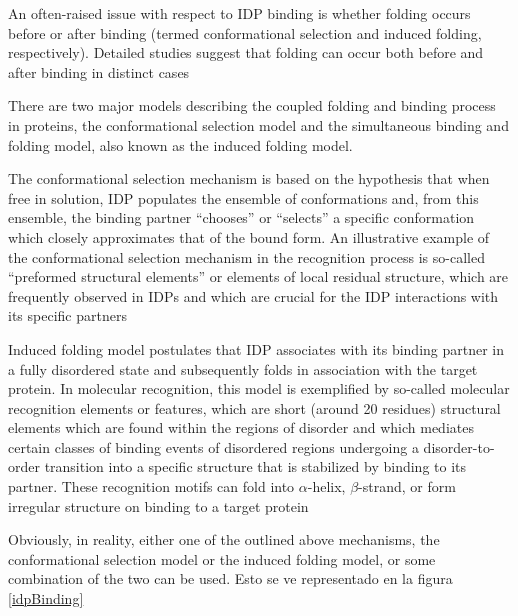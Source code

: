 An often-raised issue with respect to IDP binding is whether folding occurs before or after binding (termed conformational selection and induced folding, respectively).
Detailed studies suggest that folding can occur both before and after binding in distinct cases


There are two major models describing the coupled folding and binding process in proteins, the conformational selection model and the simultaneous binding and folding model, also known as the induced folding model.

The conformational selection mechanism is based on the hypothesis that when free in solution, IDP populates the ensemble of conformations and, from this ensemble, the binding partner “chooses” or
“selects” a specific conformation which closely approximates that of the bound form. An illustrative example of the conformational selection mechanism in the recognition process is
so-called “preformed structural elements” or elements of local residual structure, which are frequently observed in IDPs and which are crucial for the IDP interactions with its specific
partners

Induced folding model postulates that IDP associates with its binding partner in a fully disordered state and subsequently folds in association with the target protein. 
In molecular recognition, this model is exemplified by so-called molecular recognition elements or features, which are short (around 20 residues) structural elements which are found 
within the regions of disorder and which mediates certain classes of binding
events of disordered regions undergoing a disorder-to-order transition into a specific structure that is stabilized by binding to its partner.
These recognition motifs can fold into $\alpha$-helix, $\beta$-strand, or form irregular structure on binding to a target protein

Obviously, in reality, either one of the outlined above mechanisms, the conformational selection model or the induced folding model, or some combination of the two can be used.
Esto se ve representado en la figura \ref{idpBinding}



